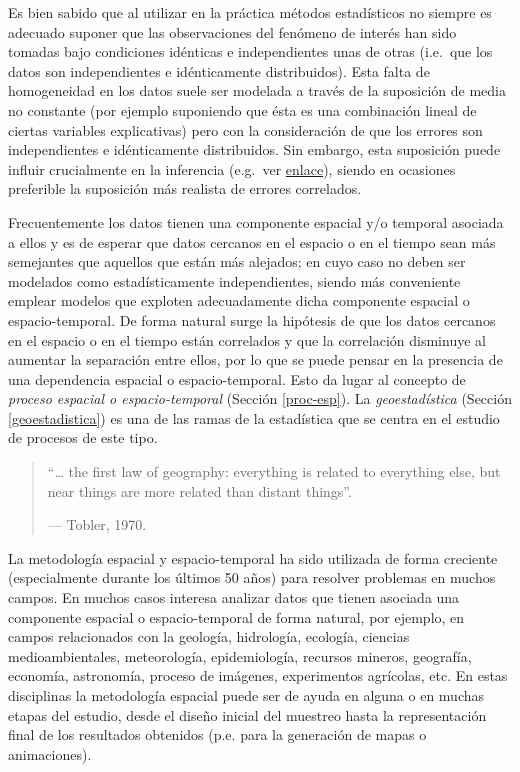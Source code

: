 \documentclass[
  spanish,
]{book}
\theoremstyle{break}
\theoremstyle{definition}
\theoremstyle{definition}
\theoremstyle{definition}
\theoremstyle{definition}
\theoremstyle{remark}
\begin{document}
Es bien sabido que al utilizar en la práctica métodos estadísticos no siempre es adecuado suponer que las observaciones del fenómeno de interés han sido tomadas bajo condiciones idénticas e independientes unas de otras (i.e.~que los datos son independientes e idénticamente distribuidos).
Esta falta de homogeneidad en los datos suele ser modelada a través de la suposición de media no constante (por ejemplo suponiendo que ésta es una combinación lineal de ciertas variables explicativas) pero con la consideración de que los errores son independientes e idénticamente distribuidos.
Sin embargo, esta suposición puede influir crucialmente en la inferencia (e.g.~ver \href{https://rubenfcasal.github.io/post/diagnosis-de-la-independencia/}{enlace}), siendo en ocasiones preferible la suposición más realista de errores correlados.

Frecuentemente los datos tienen una componente espacial y/o temporal asociada a ellos y es de esperar que datos cercanos en el espacio o en el tiempo sean más semejantes que aquellos que están más alejados; en cuyo caso no deben ser modelados como estadísticamente independientes, siendo más conveniente emplear modelos que exploten adecuadamente dicha componente espacial o espacio-temporal.
De forma natural surge la hipótesis de que los datos cercanos en el espacio o en el tiempo están correlados y que la correlación disminuye al aumentar la separación entre ellos, por lo que se puede pensar en la presencia de una dependencia espacial o espacio-temporal.
Esto da lugar al concepto de \emph{proceso espacial o espacio-temporal} (Sección \ref{proc-esp}).
La \emph{geoestadística} (Sección \ref{geoestadistica}) es una de las ramas de la estadística que se centra en el estudio de procesos de este tipo.

\begin{quote}
``\ldots{} the first law of geography: everything is related to everything else, but near things are more related than distant things''.

--- Tobler, 1970.
\end{quote}

La metodología espacial y espacio-temporal ha sido utilizada de forma creciente (especialmente durante los últimos 50 años) para resolver problemas en muchos campos.
En muchos casos interesa analizar datos que tienen asociada una componente espacial o espacio-temporal de forma natural, por ejemplo, en campos relacionados con la geología, hidrología, ecología, ciencias medioambientales, meteorología, epidemiología, recursos mineros, geografía, economía, astronomía, proceso de imágenes, experimentos agrícolas, etc.
En estas disciplinas la metodología espacial puede ser de ayuda en alguna o en muchas etapas del estudio, desde el diseño inicial del muestreo hasta la representación final de los resultados obtenidos (p.e. para la generación de mapas o animaciones).
\end{document}
